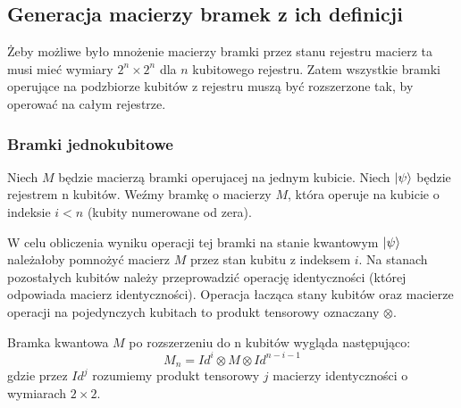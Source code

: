 \subsection{Generacja macierzy bramek z ich definicji}
Żeby możliwe było mnożenie macierzy bramki przez stanu rejestru macierz ta musi mieć wymiary $2^n \times 2^n$ dla $n$ kubitowego rejestru. Zatem wszystkie bramki operujące na podzbiorze kubitów z rejestru muszą być rozszerzone tak, by operować na całym rejestrze.
\subsubsection{Bramki jednokubitowe}
\label{oneqgate}
Niech $M$ będzie macierzą bramki operujacej na jednym kubicie. Niech $\ket{\psi}$ będzie rejestrem n kubitów.
Weźmy bramkę o macierzy $M$, która operuje na kubicie o indeksie $i < n$ (kubity numerowane od zera).
\par W celu obliczenia wyniku operacji tej bramki na stanie kwantowym $\ket{\psi}$ należałoby pomnożyć macierz $M$ przez stan kubitu z indeksem $i$. Na stanach pozostałych kubitów należy przeprowadzić operację identyczności (której odpowiada macierz identyczności). Operacja łacząca stany kubitów oraz macierze operacji na pojedynczych kubitach to produkt tensorowy oznaczany $\otimes$.
\par Bramka kwantowa $M$ po rozszerzeniu do n kubitów wygląda następująco:
\[M_n = Id^i \otimes M \otimes Id^{n-i-1}\]
gdzie przez $Id^j$ rozumiemy produkt tensorowy $j$ macierzy identyczności o wymiarach $2 \times 2$.

